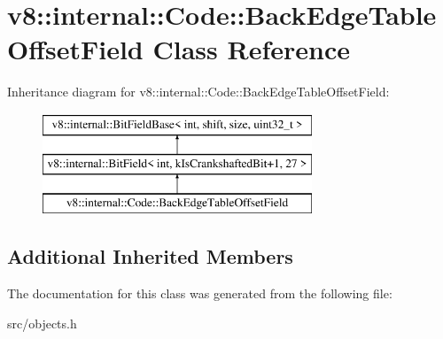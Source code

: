 \hypertarget{classv8_1_1internal_1_1_code_1_1_back_edge_table_offset_field}{}\section{v8\+:\+:internal\+:\+:Code\+:\+:Back\+Edge\+Table\+Offset\+Field Class Reference}
\label{classv8_1_1internal_1_1_code_1_1_back_edge_table_offset_field}
Inheritance diagram for v8\+:\+:internal\+:\+:Code\+:\+:Back\+Edge\+Table\+Offset\+Field\+:\begin{figure}[H]
\begin{center}
\leavevmode
\includegraphics[height=3.000000cm]{classv8_1_1internal_1_1_code_1_1_back_edge_table_offset_field}
\end{center}
\end{figure}
\subsection*{Additional Inherited Members}


The documentation for this class was generated from the following file\+:\begin{DoxyCompactItemize}
\item 
src/objects.\+h\end{DoxyCompactItemize}
